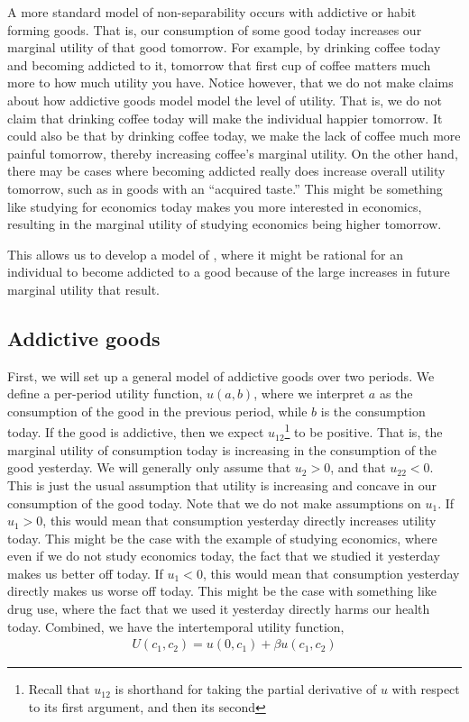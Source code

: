 A more standard model of non-separability occurs with addictive or habit forming goods. That is, our consumption of some good today increases our marginal utility of that good tomorrow. For example, by drinking coffee today and becoming addicted to it, tomorrow that first cup of coffee matters much more to how much utility you have. Notice however, that we do not make claims about how addictive goods model model the level of utility. That is, we do not claim that drinking coffee today will make the individual happier tomorrow. It could also be that by drinking coffee today, we make the lack of coffee much more painful tomorrow, thereby increasing coffee's marginal utility. On the other hand, there may be cases where becoming addicted really does increase overall utility tomorrow, such as in goods with an ``acquired taste.'' This might be something like studying for economics today makes you more interested in economics, resulting in the marginal utility of studying economics being higher tomorrow. 

This allows us to develop a model of , where it might be rational for an individual to become addicted to a good because of the large increases in future marginal utility that result.

\subsection*{Addictive goods}
First, we will set up a general model of addictive goods over two periods. We define a per-period utility function, $u(a, b)$, where we interpret $a$ as the consumption of the good in the previous period, while $b$ is the consumption today. If the good is addictive, then we expect $u_{12}$\footnote{Recall that $u_{12}$ is shorthand for taking the partial derivative of $u$ with respect to its first argument, and then its second} to be positive. That is, the marginal utility of consumption today is increasing in the consumption of the good yesterday. We will generally only assume that $u_2 > 0$, and that $u_{22} < 0$. This is just the usual assumption that utility is increasing and concave in our consumption of the good today. Note that we do not make assumptions on $u_1$. If $u_1 > 0$, this would mean that consumption yesterday directly increases utility today. This might be the case with the example of studying economics, where even if we do not study economics today, the fact that we studied it yesterday makes us better off today. If $u_1 < 0$, this would mean that consumption yesterday directly makes us worse off today. This might be the case with something like drug use, where the fact that we used it yesterday directly harms our health today. Combined, we have the intertemporal utility function,
\begin{align*}
    U(c_1, c_2) = u(0, c_1) + \beta u(c_1, c_2)
\end{align*}

